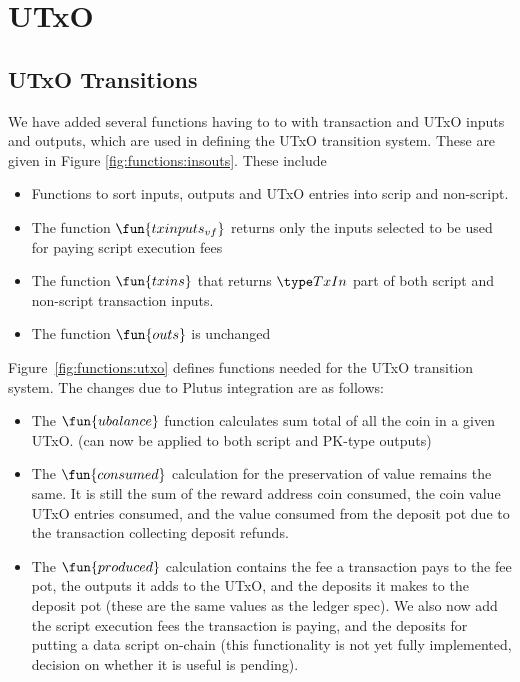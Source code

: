 \section{UTxO}
\label{sec:utxo}


\subsection{UTxO Transitions}
\label{sec:utxo-trans}

We have added several functions having to to with transaction and UTxO inputs and
outputs, which are used in defining the UTxO transition system. These are
given in Figure \ref{fig:functions:insouts}. These include

\begin{itemize}
  \item Functions to
sort inputs, outputs and UTxO entries into scrip and non-script.

  \item The function $\fun{txinputs_{vf}}$ returns only the inputs selected to be used
for paying script execution fees
  \item The function $\fun{txins}$ that returns $\TxIn$ part of both script
  and non-script transaction inputs.
  \item The function $\fun{outs}$ is unchanged
\end{itemize}

Figure~\ref{fig:functions:utxo} defines functions needed for the UTxO transition system.
The changes due to Plutus integration are as follows:

\begin{itemize}

  \item
    The $\fun{ubalance}$ function calculates sum total of all the coin in a given UTxO.
    (can now be applied to both script and PK-type outputs)

  \item The $\fun{consumed}$ calculation for the preservation of value remains the
  same. It is still the sum of the reward address coin consumed, the coin value
   UTxO entries consumed, and the value consumed from the deposit pot due
   to the transaction collecting deposit refunds.

  \item The $\fun{produced}$ calculation contains the fee a transaction pays
  to the fee pot, the outputs it adds to the UTxO, and the deposits it makes
  to the deposit pot (these are the same values as the ledger spec). We also
  now add the script execution fees the transaction is paying, and the deposits
  for putting a data script on-chain (this functionality is not yet fully
  implemented, decision on whether it is useful is pending).
\end{itemize}


